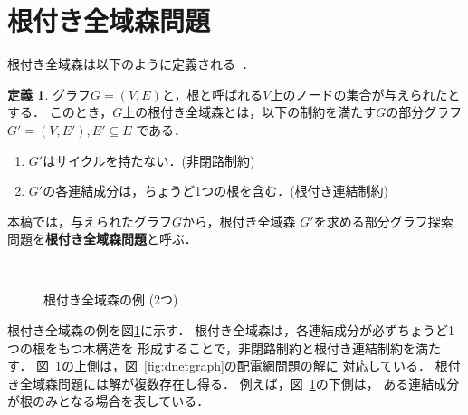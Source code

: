 ﻿\section{根付き全域森問題}\label{chap:problem}

\theoremstyle{definition}
\newtheorem*{definition*}{定義}

根付き全域森は以下のように定義される~\cite{Minato:dnet:netuki}．
\begin{definition*}
  グラフ$G=(V,E)$と，根と呼ばれる$V$上のノードの集合が与えられたとする．
  このとき，$G$上の根付き全域森とは，以下の制約を満たす$G$の部分グラフ
  $G'=(V,E'), E' \subseteq E$ である．
  \begin{enumerate}
  \item $G'$はサイクルを持たない．(非閉路制約)
  \item $G'$の各連結成分は，ちょうど1つの根を含む．(根付き連結制約)
  \end{enumerate}
本稿では，与えられたグラフ$G$から，根付き全域森
$G'$を求める部分グラフ探索問題を\textbf{根付き全域森問題}と呼ぶ．
\end{definition*}

\begin{figure}[htbp]
  \centering
  \scalebox{0.8}{}\\[1em]
  \scalebox{0.8}{}
  \caption{根付き全域森の例 (2つ)}
  \label{fig:netuki}
\end{figure}

根付き全域森の例を図\ref{fig:netuki}に示す．
根付き全域森は，各連結成分が必ずちょうど1つの根をもつ木構造を
形成することで，非閉路制約と根付き連結制約を満たす．
図~\ref{fig:netuki}の上側は，図~\ref{fig:dnetgraph}の配電網問題の解に
対応している．
根付き全域森問題には解が複数存在し得る．
例えば，図~\ref{fig:netuki}の下側は，
ある連結成分が根のみとなる場合を表している．

